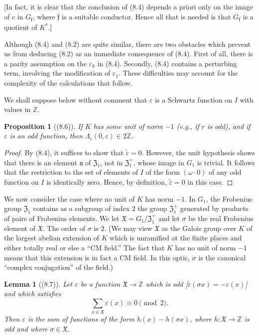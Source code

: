 \documentclass[12pt,a4paper]{article}
\theoremstyle{plain}
\newtheorem{lemma}[theorem]{Lemma}
\newtheorem{proposition}[theorem]{Proposition}
\theoremstyle{definition}
\theoremstyle{remark}
\begin{document}
[In fact, it is clear that the conclusion of (8.4) depends a priori only on the image of $c$ in $G_\mathfrak{f}$, where $\mathfrak{f}$ is a suitable conductor. Hence all that is needed is that $G_\mathfrak{f}$ is a quotient of $K^*$.]

Although (8.4) and (8.2) are quite similar, there are two obstacles which prevent us from deducing (8.2) as an immediate consequence of (8.4). First of all, there is a parity assumption on the $\varepsilon_k$ in (8.4). Secondly, (8.4) contains a perturbing term, involving the modification of $\varepsilon_1$. These difficulties may account for the complexity of the calculations that follow.

We shall suppose below without comment that $\varepsilon$ is a Schwartz function on $I$ with values in $\mathbb{Z}$.

\begin{proposition}[(8.6)]\label{prop:8.6}
If $K$ has some unit of norm $-1$ (e.g., if $r$ is odd), and if $\varepsilon$ is an odd function, then $\varLambda_c(0, \varepsilon) \in 2\mathbb{Z}$.
\end{proposition}

\begin{proof}
By (8.4), it suffices to show that $\tilde{\varepsilon} = 0$. However, the unit hypothesis shows that there is an element $\mathfrak{a}$ of $\mathfrak{Z}_1$, not in $\mathfrak{Z}_1^+$, whose image in $G_1$ is trivial. It follows that the restriction to the set of elements of $I$ of the form $(\omega \cdot 0)$ of any odd function on $I$ is identically zero. Hence, by definition, $\tilde{\varepsilon} = 0$ in this case.
\end{proof}

We now consider the case where no unit of $K$ has norm $-1$. In $G_1$, the Frobenius group $\mathfrak{Z}_1$ contains as a subgroup of index $2$ the group $\mathfrak{Z}_1^+$ generated by products of pairs of Frobenius elements. We let $\mathfrak{X} = G_1/\mathfrak{Z}_1^+$ and let $\sigma$ be the real Frobenius element of $\mathfrak{X}$. The order of $\sigma$ is $2$. (We may view $\mathfrak{X}$ as the Galois group over $K$ of the largest abelian extension of $K$ which is unramified at the finite places and either totally real or else a ``CM field.'' The fact that $K$ has no unit of norm $-1$ means that this extension is in fact a CM field. In this optic, $\sigma$ is the canonical ``complex conjugation'' of the field.)

\begin{lemma}[(8.7)]\label{lem:8.7}
Let $\varepsilon$ be a function $\mathfrak{X} \to \mathbb{Z}$ which is odd [$\varepsilon(\sigma x) = -\varepsilon(x)$] and which satisfies
\[
\sum_{x \in \mathfrak{X}} \varepsilon(x) \equiv 0 \pmod{2}.
\]
Then $\varepsilon$ is the sum of functions of the form $h(x) - h(\sigma x)$, where $h: \mathfrak{X} \to \mathbb{Z}$ is odd and where $\sigma \in \mathfrak{X}$.
\end{lemma}
\end{document}
